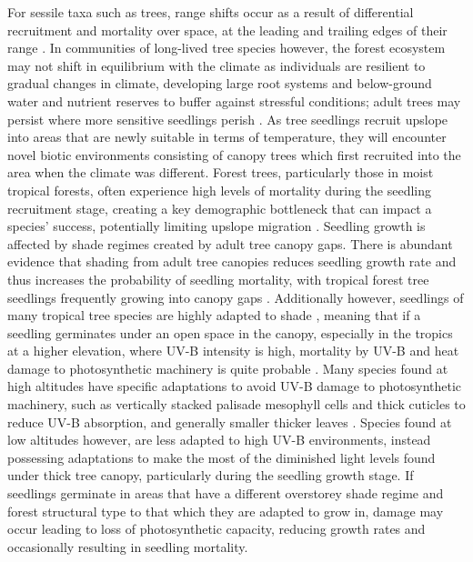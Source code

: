 \documentclass[a4paper, 11pt]{article}
\begin{document}
For sessile taxa such as trees, range shifts occur as a result of differential recruitment and mortality over space, at the leading and trailing edges of their range \citep{Corlett2013}. In communities of long-lived tree species however, the forest ecosystem may not shift in equilibrium with the climate as individuals are resilient to gradual changes in climate, developing large root systems and below-ground water and nutrient reserves to buffer against stressful conditions; adult trees may persist where more sensitive seedlings perish \citep{Bell2014, Lenoir2009}. As tree seedlings recruit upslope into areas that are newly suitable in terms of temperature, they will encounter novel biotic environments consisting of canopy trees which first recruited into the area when the climate was different. Forest trees, particularly those in moist tropical forests, often experience high levels of mortality during the seedling recruitment stage, creating a key demographic bottleneck that can impact a species' success, potentially limiting upslope migration \citep{Coomes2000}. Seedling growth is affected by shade regimes created by adult tree canopy gaps. There is abundant evidence that shading from adult tree canopies reduces seedling growth rate and thus increases the probability of seedling mortality, with tropical forest tree seedlings frequently growing into canopy gaps \citep{Valladares2016}. Additionally however, seedlings of many tropical tree species are highly adapted to shade \citep{Matsubara2009}, meaning that if a seedling germinates under an open space in the canopy, especially in the tropics at a higher elevation, where UV-B intensity is high, mortality by UV-B and heat damage to photosynthetic machinery is quite probable \citep{Krause2001, Li2010}. Many species found at high altitudes have specific adaptations to avoid UV-B damage to photosynthetic machinery, such as vertically stacked palisade mesophyll cells and thick cuticles to reduce UV-B absorption, and generally smaller thicker leaves \citep{Prado2012}. Species found at low altitudes however, are less adapted to high UV-B environments, instead possessing adaptations to make the most of the diminished light levels found under thick tree canopy, particularly during the seedling growth stage. If seedlings germinate in areas that have a different overstorey shade regime and forest structural type to that which they are adapted to grow in, damage may occur leading to loss of photosynthetic capacity, reducing growth rates and occasionally resulting in seedling mortality. 
\end{document}
